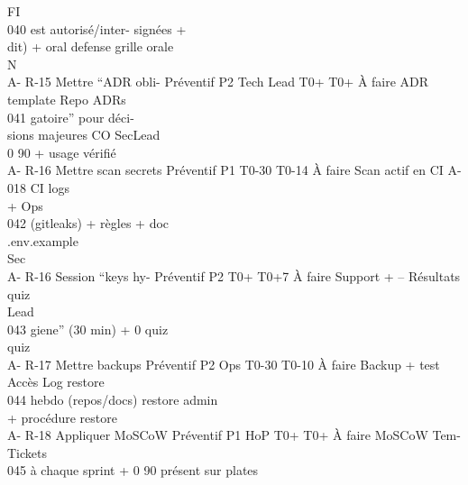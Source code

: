 \documentclass[12pt,landscape,a4paper]{article}
\begin{document}
\vspace{0.5em}
FI\\
040         est autorisé/inter-                                                    signées +\\
dit) + oral defense                                                    grille orale\\
\vspace{0.5em}
\vspace{0.5em}
\vspace{0.5em}
\vspace{0.5em}
N\\
A- R-15     Mettre “ADR obli- Préventif P2      Tech Lead    T0+ T0+ À faire       ADR template Repo          ADRs\\
041         gatoire” pour déci-\\
sions majeures             CO       SecLead\\
0     90              + usage vérifié\\
\vspace{0.5em}
\vspace{0.5em}
A- R-16     Mettre scan secrets Préventif P1                 T0-30 T0-14 À faire   Scan actif en CI A-018     CI logs\\
+ Ops\\
042         (gitleaks) + règles                                                    + doc\\
.env.example\\
Sec\\
A- R-16     Session “keys hy-    Préventif P2                T0+ T0+7 À faire      Support +       –          Résultats quiz\\
Lead\\
043         giene” (30 min) +                                0                     quiz\\
quiz\\
A- R-17     Mettre backups       Préventif P2   Ops          T0-30 T0-10 À faire   Backup + test Accès        Log restore\\
044         hebdo (repos/docs)                                                     restore       admin\\
+ procédure restore\\
A- R-18     Appliquer MoSCoW Préventif P1       HoP          T0+ T0+ À faire       MoSCoW          Tem-       Tickets\\
045         à chaque sprint +                                0     90              présent sur     plates\\
\end{document}
